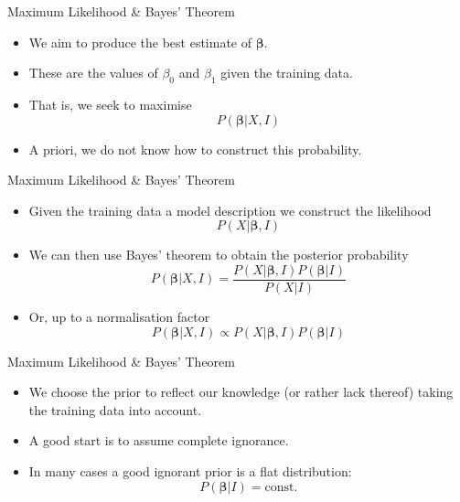 \documentclass[mathserif, aspectratio=169]{beamer}
\begin{document}
\begin{frame}{Maximum Likelihood \& Bayes' Theorem}
	\begin{itemize}
		\item We aim to produce the best estimate of $\bm{\beta}$.
		\item These are the  values of $\beta_0$ and $\beta_1$ 
			given the training data.
		\item That is, we seek to maximise
			\[ P(\bm{\beta}\vert X, I) \]
		\item A priori, we do not know how to construct this probability.
	\end{itemize}
\end{frame}

\begin{frame}{Maximum Likelihood \& Bayes' Theorem}
	\begin{itemize}
		\item Given the training data  a model description we  construct the likelihood
			\[ P(X\vert\bm{\beta}, I) \]
		\item We can then use Bayes' theorem to obtain the posterior probability
			\[
				P(\bm{\beta}\vert X, I) = 
				\frac{P(X\vert\bm{\beta}, I) P(\bm{\beta}\vert I)}{P(X\vert I)}
			\]
		\item Or, up to a normalisation factor
			\[
				P(\bm{\beta}\vert X, I) \propto P(X\vert\bm{\beta}, I) P(\bm{\beta}\vert I)
			\]
	\end{itemize}
\end{frame}

\begin{frame}{Maximum Likelihood \& Bayes' Theorem}
	\begin{itemize}
		\item We choose the prior to reflect our knowledge (or rather lack thereof) 
			taking the training data into account.
		\item A good start is to assume complete ignorance.
		\item In many cases a good ignorant prior is a flat distribution:
			\[ P(\bm{\beta}\vert I) = \text{const.} \]
	\end{itemize}
\end{frame}
\end{document}
